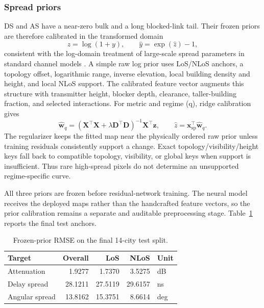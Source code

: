 \documentclass[journal]{IEEEtran}
\begin{document}
\subsubsection{Spread priors}
DS and AS have a near-zero bulk and a long blocked-link tail. Their frozen
priors are therefore calibrated in the transformed domain
\begin{equation}
z=\log(1+y),\qquad \hat y=\exp(\hat z)-1,
\label{eq:spread-transform-paper}
\end{equation}
consistent with the log-domain treatment of large-scale spread parameters in
standard channel models \cite{tr38901,winner2}. A simple raw log prior uses
LoS/NLoS anchors, a topology offset, logarithmic range, inverse elevation,
local building density and height, and local NLoS support. The calibrated
feature vector augments this structure with transmitter height, blocker depth,
clearance, taller-building fraction, and selected interactions. For metric and
regime (q), ridge calibration gives
\begin{equation}
\widehat{\mathbf w}_{q}=
(\mathbf X^{\top}\mathbf X+\lambda\mathbf D^{\top}\mathbf D)^{-1}
\mathbf X^{\top}\mathbf z,\qquad
\hat z=\mathbf x_{\mathrm{sp}}^{\top}\widehat{\mathbf w}_{q}.
\label{eq:concise-spread-prior}
\end{equation}
The regularizer keeps the fitted map near the physically ordered raw prior
unless training residuals consistently support a change. Exact
topology/visibility/height keys fall back to compatible topology, visibility,
or global keys when support is insufficient. Thus rare high-spread pixels do
not determine an unsupported regime-specific curve.

All three priors are frozen before residual-network training. The neural model
receives the deployed maps rather than the handcrafted feature vectors, so the
prior calibration remains a separate and auditable preprocessing stage.
Table~\ref{tab:prior-only-anchor} reports the final test anchors.

\begin{table}[!t]
\centering
\caption{Frozen-prior RMSE on the final 14-city test split.}
\label{tab:prior-only-anchor}
\scriptsize
\setlength{\tabcolsep}{4pt}
\begin{tabular}{lrrrl}
\toprule
Target & Overall & LoS & NLoS & Unit \\
\midrule
Attenuation & 1.9277 & 1.7370 & 3.5275 & dB \\
Delay spread & 28.1211 & 27.5119 & 29.6157 & ns \\
Angular spread & 13.8162 & 15.3751 & 8.6614 & deg \\
\bottomrule
\end{tabular}
\end{table}
\end{document}
